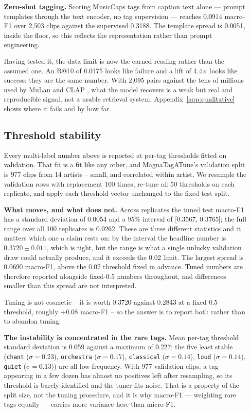 \documentclass[conference]{IEEEtran}
\newcommand{\BootLeadCI}{[0.3567, 0.3765]}
\newcommand{\BootLeadFixed}{0.2843}
\newcommand{\BootLeadSpread}{0.0262}
\newcommand{\BootLeadStd}{0.0054}
\newcommand{\BootLeadTuned}{0.3720}
\newcommand{\BootThrStdMax}{0.227}
\newcommand{\BootThrStdMean}{0.059}
\newcommand{\BootValRows}{977}
\newcommand{\BootVerdict}{The largest spread is 0.0690 macro-F1, above the 0.02 threshold fixed in advance. Tuned numbers are therefore reported alongside fixed-0.5 numbers throughout, and differences smaller than this spread are not interpreted.}
\newcommand{\BootWorstTags}{\texttt{chant} ($\sigma=0.23$), \texttt{orchestra} ($\sigma=0.17$), \texttt{classical} ($\sigma=0.14$), \texttt{loud} ($\sigma=0.14$), \texttt{quiet} ($\sigma=0.13$)}
\newcommand{\FourLiftTen}{4.4}
\newcommand{\FourRAtTen}{0.0175}
\newcommand{\MCTrain}{2{,}095}
\newcommand{\NBoot}{100}
\newcommand{\ZeroShotClips}{2{,}503}
\newcommand{\ZeroShotF}{0.0914}
\newcommand{\ZeroShotSpread}{0.0051}
\newcommand{\ZeroShotSup}{0.3188}
\begin{document}
\textbf{Zero-shot tagging.} Scoring MusicCaps tags from caption text alone
--- prompt templates through the text encoder, no tag supervision --- reaches
\ZeroShotF{} macro-F1 over \ZeroShotClips{} clips against the supervised
\ZeroShotSup{}. The template spread is \ZeroShotSpread{}, inside the floor, so
this reflects the representation rather than prompt engineering.

Having tested it, the data limit is now the earned reading rather than the
assumed one. An R@10 of \FourRAtTen{} looks like failure and a lift of
\FourLiftTen{}$\times$ looks like success; they are the same number. With
\MCTrain{} pairs against the tens of millions used by MuLan
\cite{huang2022mulan} and CLAP \cite{elizalde2023clap}, what the model recovers
is a weak but real and reproducible signal, not a usable retrieval system.
Appendix~\ref{app:qualitative} shows where it fails and by how far.

\subsection{Threshold stability}
\label{sec:thresholds}
Every multi-label number above is reported at per-tag thresholds fitted on
validation. That fit is a fit like any other, and MagnaTagATune's validation
split is 977 clips from 14 artists -- small, and correlated within artist. We
resample the validation rows with replacement \NBoot{} times, re-tune all 50
thresholds on each replicate, and apply each threshold vector unchanged to the
fixed test split.



\textbf{What moves, and what does not.} Across replicates the tuned test
macro-F1 has a standard deviation of \BootLeadStd{} and a 95\% interval of
\BootLeadCI{}; the full range over all \NBoot{} replicates is
\BootLeadSpread{}. These are three different statistics and it matters which one
a claim rests on: by the interval the headline number is
$\BootLeadTuned{} \pm 0.011$, which is tight, but the range is what a single
unlucky validation draw could actually produce, and it exceeds the 0.02 limit.
\BootVerdict

Tuning is not cosmetic -- it is worth \BootLeadTuned{} against \BootLeadFixed{}
at a fixed 0.5 threshold, roughly $+0.08$ macro-F1 -- so the answer is to report
both rather than to abandon tuning.

\textbf{The instability is concentrated in the rare tags.} Mean per-tag
threshold standard deviation is \BootThrStdMean{} against a maximum of
\BootThrStdMax{}; the five least stable (\BootWorstTags{}) are all
low-frequency. With \BootValRows{} validation clips, a tag appearing in a few
dozen has almost no positives left after resampling, so its threshold is barely
identified and the tuner fits noise. That is a property of the split size, not
the tuning procedure, and it is why macro-F1 --- weighting rare tags equally ---
carries more variance here than micro-F1.
\end{document}
